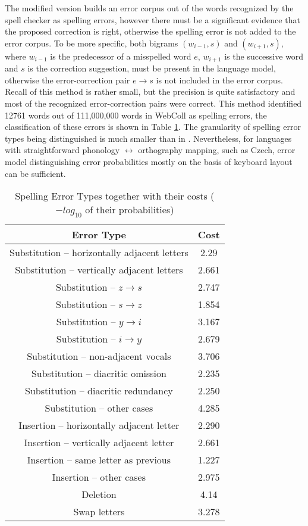 \documentclass[11pt]{article}
\begin{document}
The modified version builds an error corpus out of the words recognized by the
spell checker as spelling errors, however there must be a significant evidence
that the proposed correction is right, otherwise the spelling error is not
added to the error corpus. To be more specific, both bigrams $ (w_{i-1}, s)$
and $(w_{i+1}, s)$, where $w_{i-1}$ is the predecessor of a misspelled word $e$,
$w_{i +1}$ is the successive word and $s$ is the correction suggestion, must be
present in the language model, otherwise the error-correction pair $e \to s$ is
not included in the error corpus. Recall of this method is rather small, but
the precision is quite satisfactory and most of the recognized error-correction pairs were correct. This method identified 12761 words out of 111,000,000 words in WebColl as spelling errors, the classification of these errors
is shown in Table \ref{table:error_types_table}. The granularity of
spelling error types being distinguished is much smaller than in
\cite{Church1991}. Nevertheless, for languages with straightforward phonology
$\leftrightarrow$ orthography mapping, such as Czech, error model
distinguishing error probabilities mostly on the basis of keyboard layout can
be sufficient.
%
\begin{table}
\begin{small}
    \begin{center}
    \begin{tabular}{ | c | c }
        Error Type & Cost\\
        \hline
        Substitution -- horizontally adjacent letters & 2.29\\
        Substitution -- vertically adjacent letters & 2.661\\
        Substitution -- $z \to s$ & 2.747\\
        Substitution -- $s \to z$ & 1.854\\
        Substitution -- $y \to i$ & 3.167\\
        Substitution -- $i \to y$ & 2.679\\
        Substitution -- non-adjacent vocals & 3.706\\
        Substitution -- diacritic omission & 2.235\\
        Substitution -- diacritic redundancy & 2.250\\
        Substitution -- other cases & 4.285\\
        Insertion -- horizontally adjacent letter & 2.290\\
        Insertion -- vertically adjacent letter & 2.661\\
        Insertion -- same letter as previous & 1.227\\
        Insertion -- other cases & 2.975\\
        Deletion & 4.14\\
        Swap letters & 3.278\\
    \end{tabular}
    \end{center}
    \caption{Spelling Error Types together with their costs ($-log_{10}$ of their probabilities)}
    \label{table:error_types_table}
    \end{small}
\end{table}
\end{document}
